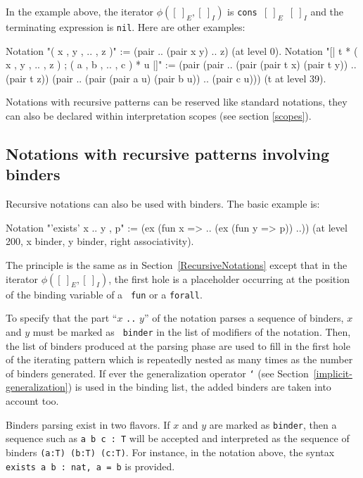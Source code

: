 In the example above, the iterator $\phi([~]_E,[~]_I)$ is {\tt cons
  $[~]_E$ $[~]_I$} and the terminating expression is {\tt nil}. Here are
other examples:
\begin{coq_example*}
Notation "( x , y , .. , z )" := (pair .. (pair x y) .. z) (at level 0).
Notation "[| t * ( x , y , .. , z ) ; ( a , b , .. , c )  * u |]" :=
  (pair (pair .. (pair (pair t x) (pair t y)) .. (pair t z))
        (pair .. (pair (pair a u) (pair b u)) .. (pair c u)))
  (t at level 39).
\end{coq_example*}

Notations with recursive patterns can be reserved like standard
notations, they can also be declared within interpretation scopes (see
section \ref{scopes}).

\subsection{Notations with recursive patterns involving binders}

Recursive notations can also be used with binders. The basic example is:

\begin{coq_example*}
Notation "'exists' x .. y , p" := (ex (fun x => .. (ex (fun y => p)) ..))
  (at level 200, x binder, y binder, right associativity).
\end{coq_example*}

The principle is the same as in Section~\ref{RecursiveNotations}
except that in the iterator $\phi([~]_E,[~]_I)$, the first hole is a
placeholder occurring at the position of the binding variable of a {\tt
  fun} or a {\tt forall}.

To specify that the part ``$x$ {\tt ..} $y$'' of the notation
parses a sequence of binders, $x$ and $y$ must be marked as {\tt
  binder} in the list of modifiers of the notation.  Then, the list of
binders produced at the parsing phase are used to fill in the first
hole of the iterating pattern which is repeatedly nested as many times
as the number of binders generated. If ever the generalization
operator {\tt `} (see Section~\ref{implicit-generalization}) is used
in the binding list, the added binders are taken into account too.

Binders parsing exist in two flavors. If $x$ and $y$ are marked as
{\tt binder}, then a sequence such as {\tt a b c : T} will be accepted
and interpreted as the sequence of binders {\tt (a:T) (b:T)
  (c:T)}. For instance, in the notation above, the syntax {\tt exists
  a b : nat, a = b} is provided.

